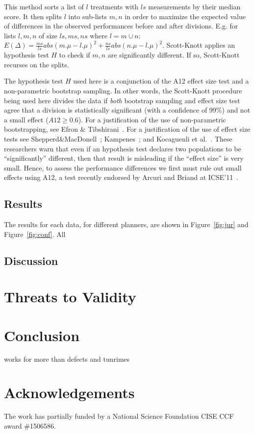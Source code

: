 \documentclass{sig-alternate}
\newcommand{\fig}[1]{Figure~\ref{fig:#1}}
\begin{document}
This method
sorts a list of $l$ treatments with $ls$ measurements by their median
score. It then
splits $l$ into sub-lists $m,n$ in order to maximize the expected value of
 differences  in the observed performances
before and after divisions. E.g. for lists $l,m,n$ of size $ls,ms,ns$ where $l=m\cup n$:
 $E(\Delta)=\frac{ms}{ls}abs(m.\mu - l.\mu)^2 + \frac{ns}{ls}abs(n.\mu - l.\mu)^2$.
Scott-Knott  applies an  hypothesis test $H$ to check
if $m,n$ are significantly different. If so, Scott-Knott  recurses on the splits.

The hypothesis test $H$ used here is a conjunction of the A12 effect size test and a non-parametric bootstrap sampling. In other words, the Scott-Knott procedure being used here divides the data if \textit{both} bootstrap sampling and effect size test agree that a division is statistically significant (with a confidence of 99\%) and not a small effect ($A12 \ge 0.6$). For a justification of the use of non-parametric bootstrapping, see Efron \& Tibshirani~\cite[p220-223]{efron93}. For a justification of the use of effect size tests see Shepperd\&MacDonell~\cite{shepperd12a}; Kampenes~\cite{kampenes07}; and Kocaguenli et al.~\cite{Kocaguneli2013:ep}. These researchers warn that even if an hypothesis test declares two populations to be ``significantly'' different, then that result is misleading if the ``effect size'' is very small. Hence, to assess the performance differences we first must rule out small effects using A12, a test   recently endorsed by Arcuri and Briand at ICSE'11~\cite{arcuri11}.

\subsection{Results}

The results for each data, for different planners, are shown in \fig{jur} and \fig{conf}. All
\subsection{Discussion}
\section{Threats to Validity}

\section{Conclusion}

works for more than defects and tunrimes

\section*{Acknowledgements}
The work has partially funded by a National Science Foundation CISE CCF award \#1506586.



\end{document}
